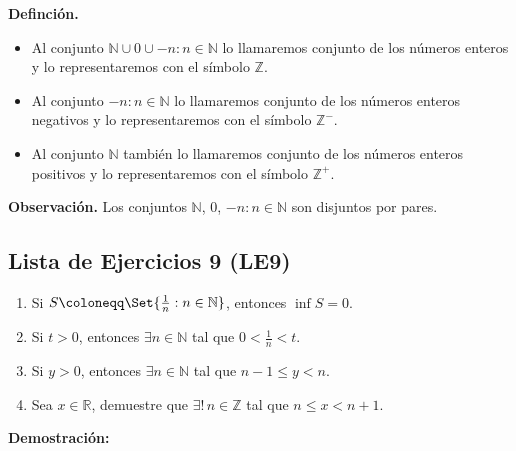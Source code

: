 \documentclass[11pt]{article}
\newcommand{\N}{\mathbb{N}}
\newcommand{\Z}{\mathbb{Z}}
\newcommand{\R}{\mathbb{R}}
\let\set\Set
\begin{document}
\textbf{Definción.} \begin{itemize}
    \item Al conjunto $\N \cup {0} \cup {-n: n\in \N}$ lo llamaremos conjunto de los números enteros y lo representaremos con el símbolo $\Z$.
    \item Al conjunto ${-n: n\in \N}$ lo llamaremos conjunto de los números enteros negativos y lo representaremos con el símbolo $\Z^-$.
    \item Al conjunto $\N$ también lo llamaremos conjunto de los números enteros positivos y lo representaremos con el símbolo $\Z^+$.
\end{itemize}

\textbf{Observación.} Los conjuntos $\N$, ${0}$, ${-n: n\in \N}$ son disjuntos por pares.

\subsection*{Lista de Ejercicios 9 (LE9)}

\begin{enumerate}[label=\alph*)]
    \item Si $S \coloneqq \set{\frac{1}{n}: n\in \N}$, entonces $\inf{S=0}$.
    \item Si $t>0$, entonces $\exists n\in \N$ tal que $0<\frac{1}{n}<t$.
    \item Si $y>0$, entonces $\exists n\in \N$ tal que $n-1\leq y< n$.
    \item Sea $x\in \R$, demuestre que $\exists! \, n\in \Z$ tal que $n\leq x<n+1$.
\end{enumerate}

\textbf{Demostración:}
\end{document}

